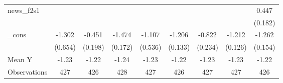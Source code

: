 {\begin{tabular}{l*{8}{c}}
\addlinespace
news\_f2s1   &                     &                     &                     &                     &                     &                     &                     &       0.447\sym{**} \\
            &                     &                     &                     &                     &                     &                     &                     &     (0.182)         \\
\addlinespace
\_cons      &      -1.302\sym{*}  &      -0.451\sym{**} &      -1.474\sym{***}&      -1.107\sym{*}  &      -1.206\sym{***}&      -0.822\sym{***}&      -1.212\sym{***}&      -1.262\sym{***}\\
            &     (0.654)         &     (0.198)         &     (0.172)         &     (0.536)         &     (0.133)         &     (0.234)         &     (0.126)         &     (0.154)         \\
\midrule
Mean Y      &       -1.23         &       -1.22         &       -1.24         &       -1.23         &       -1.22         &       -1.23         &       -1.23         &       -1.22         \\
Observations&         427         &         426         &         428         &         427         &         426         &         427         &         427         &         426         \\
\bottomrule
\end{tabular}
}
